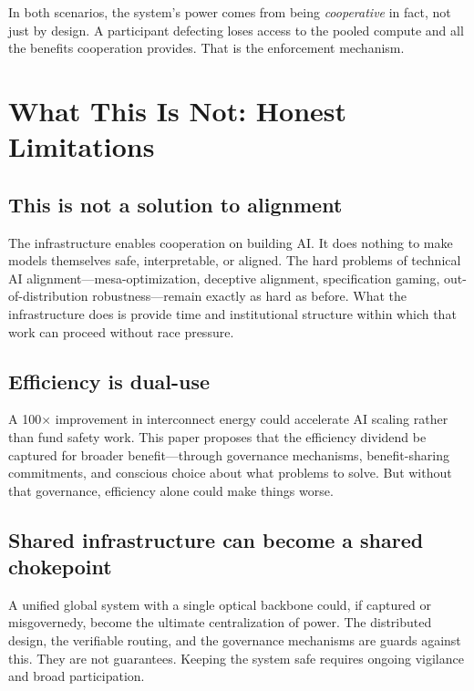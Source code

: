 \documentclass[12pt]{article}
\begin{document}
\noindent In both scenarios, the system's power comes from being \emph{cooperative}
in fact, not just by design. A participant defecting loses access to the pooled
compute and all the benefits cooperation provides. That is the enforcement
mechanism.

\section{What This Is Not: Honest Limitations}
\label{sec:limits}

\subsection{This is not a solution to alignment}

The infrastructure enables cooperation on building AI. It does nothing to make
models themselves safe, interpretable, or aligned. The hard problems of technical
AI alignment---mesa-optimization, deceptive alignment, specification gaming,
out-of-distribution robustness---remain exactly as hard as before. What the
infrastructure does is provide time and institutional structure within which that
work can proceed without race pressure.

\subsection{Efficiency is dual-use}

A 100$\times$ improvement in interconnect energy could accelerate AI scaling
rather than fund safety work. This paper proposes that the efficiency dividend
be captured for broader benefit---through governance mechanisms, benefit-sharing
commitments, and conscious choice about what problems to solve. But without that
governance, efficiency alone could make things worse.

\subsection{Shared infrastructure can become a shared chokepoint}

A unified global system with a single optical backbone could, if captured or
misgovernedy, become the ultimate centralization of power. The distributed
design, the verifiable routing, and the governance mechanisms are guards against
this. They are not guarantees. Keeping the system safe requires ongoing vigilance
and broad participation.
\end{document}
